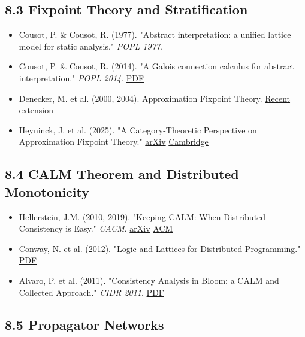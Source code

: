 \documentclass[11pt]{article}
\begin{document}
\subsection{8.3 Fixpoint Theory and Stratification}
\label{sec:org0ebc88e}

\begin{itemize}
\item Cousot, P. \& Cousot, R. (1977). "Abstract interpretation: a unified lattice
model for static analysis." \emph{POPL 1977}.
\item Cousot, P. \& Cousot, R. (2014). "A Galois connection calculus for abstract
interpretation." \emph{POPL 2014}.
\href{https://www.di.ens.fr/\~cousot/publications.www/CousotCousot-POPL14-ACM-p2-3-2014.pdf}{PDF}
\item Denecker, M. et al. (2000, 2004). Approximation Fixpoint Theory.
\href{https://proceedings.kr.org/2021/32/kr2021-0032-heyninck-et-al.pdf}{Recent extension}
\item Heyninck, J. et al. (2025). "A Category-Theoretic Perspective on
Approximation Fixpoint Theory."
\href{https://arxiv.org/pdf/2502.09234}{arXiv}
\href{https://www.cambridge.org/core/journals/theory-and-practice-of-logic-programming/article/categorytheoretic-perspective-on-higherorder-approximation-fixpoint-theory/D3A56D482FE54B7DA41C155021088E39}{Cambridge}
\end{itemize}
\subsection{8.4 CALM Theorem and Distributed Monotonicity}
\label{sec:org8493005}

\begin{itemize}
\item Hellerstein, J.M. (2010, 2019). "Keeping CALM: When Distributed Consistency
is Easy." \emph{CACM}.
\href{https://arxiv.org/abs/1901.01930}{arXiv}
\href{https://cacm.acm.org/research/keeping-calm/}{ACM}
\item Conway, N. et al. (2012). "Logic and Lattices for Distributed Programming."
\href{https://dsf.berkeley.edu/papers/UCB-lattice-tr.pdf}{PDF}
\item Alvaro, P. et al. (2011). "Consistency Analysis in Bloom: a CALM and
Collected Approach." \emph{CIDR 2011}.
\href{https://people.ucsc.edu/\~palvaro/cidr11.pdf}{PDF}
\end{itemize}
\subsection{8.5 Propagator Networks}
\label{sec:org3571a28}
\end{document}
